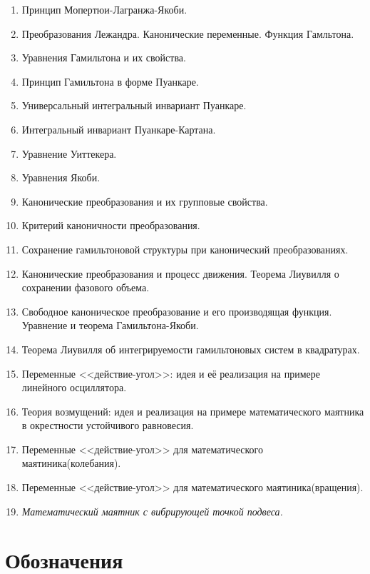 \documentclass[a4paper,12pt]{article}
\begin{document}
\begin{enumerate}
\item Принцип Мопертюи-Лагранжа-Якоби.
\item Преобразования Лежандра. Канонические переменные. Функция Гамльтона.
\item Уравнения Гамильтона и их свойства.
\item Принцип Гамильтона в форме Пуанкаре.
\item Универсальный интегральный инвариант Пуанкаре.
\item Интегральный инвариант Пуанкаре-Картана.
\item Уравнение Уиттекера.
\item Уравнения Якоби.
\item Канонические преобразования и их групповые свойства.
\item Критерий каноничности преобразования.
\item Сохранение гамильтоновой структуры при канонический преобразованиях.
\item Канонические преобразования и процесс движения. Теорема Лиувилля
  о сохранении фазового объема.
\item Свободное каноническое преобразование и его производящая
  функция. Уравнение и теорема Гамильтона-Якоби.
\item Теорема Лиувилля об интегрируемости гамильтоновых систем в квадратурах.
\item Переменные <<действие-угол>>: идея и её реализация на примере линейного осциллятора.
\item Теория возмущений: идея и реализация на примере математического
  маятника в окрестности устойчивого равновесия.
\item Переменные <<действие-угол>> для математического маятиника(колебания).
\item Переменные <<действие-угол>> для математического маятиника(вращения).
\item \textit{Математический маятник с вибрирующей точкой подвеса.}
\end{enumerate}
\section*{Обозначения}
\end{document}
